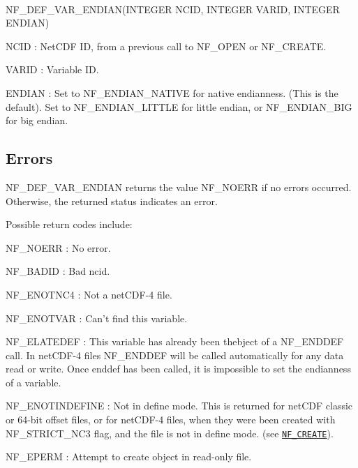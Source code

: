  

N\+F\+\_\+\+D\+E\+F\+\_\+\+V\+A\+R\+\_\+\+E\+N\+D\+I\+A\+N(\+I\+N\+T\+E\+G\+E\+R N\+C\+I\+D, I\+N\+T\+E\+G\+E\+R V\+A\+R\+I\+D, I\+N\+T\+E\+G\+E\+R E\+N\+D\+I\+A\+N)

{\ttfamily N\+C\+ID} \+: Net\+C\+DF ID, from a previous call to N\+F\+\_\+\+O\+P\+EN or N\+F\+\_\+\+C\+R\+E\+A\+TE.

{\ttfamily V\+A\+R\+ID} \+: Variable ID.

{\ttfamily E\+N\+D\+I\+AN} \+: Set to N\+F\+\_\+\+E\+N\+D\+I\+A\+N\+\_\+\+N\+A\+T\+I\+VE for native endianness. (This is the default). Set to N\+F\+\_\+\+E\+N\+D\+I\+A\+N\+\_\+\+L\+I\+T\+T\+LE for little endian, or N\+F\+\_\+\+E\+N\+D\+I\+A\+N\+\_\+\+B\+IG for big endian.

\subsection*{Errors }

N\+F\+\_\+\+D\+E\+F\+\_\+\+V\+A\+R\+\_\+\+E\+N\+D\+I\+AN returns the value N\+F\+\_\+\+N\+O\+E\+RR if no errors occurred. Otherwise, the returned status indicates an error.

Possible return codes include\+:

{\ttfamily N\+F\+\_\+\+N\+O\+E\+RR} \+: No error.

{\ttfamily N\+F\+\_\+\+B\+A\+D\+ID} \+: Bad ncid.

{\ttfamily N\+F\+\_\+\+E\+N\+O\+T\+N\+C4} \+: Not a net\+C\+D\+F-\/4 file.

{\ttfamily N\+F\+\_\+\+E\+N\+O\+T\+V\+AR} \+: Can’t find this variable.

{\ttfamily N\+F\+\_\+\+E\+L\+A\+T\+E\+D\+EF} \+: This variable has already been thebject of a N\+F\+\_\+\+E\+N\+D\+D\+EF call. In net\+C\+D\+F-\/4 files N\+F\+\_\+\+E\+N\+D\+D\+EF will be called automatically for any data read or write. Once enddef has been called, it is impossible to set the endianness of a variable.

{\ttfamily N\+F\+\_\+\+E\+N\+O\+T\+I\+N\+D\+E\+F\+I\+NE} \+: Not in define mode. This is returned for net\+C\+DF classic or 64-\/bit offset files, or for net\+C\+D\+F-\/4 files, when they were been created with N\+F\+\_\+\+S\+T\+R\+I\+C\+T\+\_\+\+N\+C3 flag, and the file is not in define mode. (see \href{#NF_005fCREATE}{\tt N\+F\+\_\+\+C\+R\+E\+A\+TE}).

{\ttfamily N\+F\+\_\+\+E\+P\+E\+RM} \+: Attempt to create object in read-\/only file.

